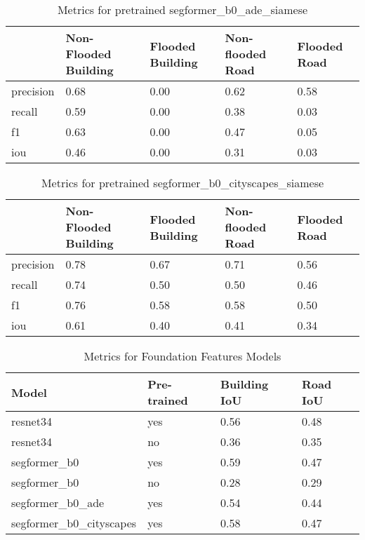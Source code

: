 \begin{table}
    \begin{tabular}{lllll}
         & Non-Flooded Building & Flooded Building & Non-flooded Road & Flooded Road \\
        \hline
        precision & 0.68 & 0.00 & 0.62 & 0.58 \\
        recall & 0.59 & 0.00 & 0.38 & 0.03 \\
        f1 & 0.63 & 0.00 & 0.47 & 0.05 \\
        iou & 0.46 & 0.00 & 0.31 & 0.03 \\
    \end{tabular}
    \caption{Metrics for pretrained segformer\_b0\_ade\_siamese}
\end{table}

\begin{table}
    \begin{tabular}{lllll}
         & Non-Flooded Building & Flooded Building & Non-flooded Road & Flooded Road \\
        \hline
        precision & 0.78 & 0.67 & 0.71 & 0.56 \\
        recall & 0.74 & 0.50 & 0.50 & 0.46 \\
        f1 & 0.76 & 0.58 & 0.58 & 0.50 \\
        iou & 0.61 & 0.40 & 0.41 & 0.34 \\
    \end{tabular}
    \caption{Metrics for pretrained segformer\_b0\_cityscapes\_siamese}
\end{table}

\begin{table}
    \begin{tabular}{llll}
        Model & Pre-trained & Building IoU & Road IoU \\
        \hline
        resnet34 & yes & 0.56 & 0.48 \\
        resnet34 & no & 0.36 & 0.35 \\
        segformer\_b0 & yes & 0.59 & 0.47 \\
        segformer\_b0 & no & 0.28 & 0.29 \\
        segformer\_b0\_ade & yes & 0.54 & 0.44 \\
        segformer\_b0\_cityscapes & yes & 0.58 & 0.47 \\
    \end{tabular}
    \caption{Metrics for Foundation Features Models}
\end{table}
